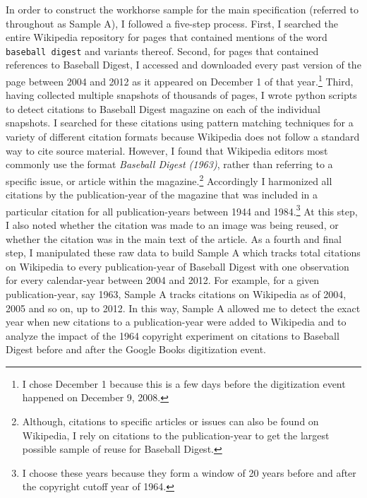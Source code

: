 \documentclass[11pt]{article}
\begin{document}
In order to construct the workhorse sample for the main specification (referred to throughout as Sample A), I followed a five-step process. First, I searched the entire Wikipedia repository for pages that contained mentions of the word \texttt{baseball digest} and variants thereof.  Second, for pages that contained references to Baseball Digest, I accessed and downloaded every past version of the page between 2004 and 2012 as it appeared on December 1 of that year.\footnote{I chose December 1 because this is a few days before the digitization event happened on December 9, 2008.} Third, having collected multiple snapshots of thousands of pages, I wrote python scripts to detect citations to Baseball Digest magazine on each of the individual snapshots. I searched for these citations using pattern matching techniques for a variety of different citation formats because Wikipedia does not follow a standard way to cite source material. However, I found that Wikipedia editors most commonly use the format \emph{Baseball Digest (1963)}, rather than referring to a specific issue, or article within the magazine.\footnote{Although, citations to specific articles or issues can also be found on Wikipedia, I rely on citations to the publication-year to get the largest possible sample of reuse for Baseball Digest.} Accordingly I harmonized all citations by the publication-year of the magazine that was included in a particular citation for all publication-years between 1944 and 1984.\footnote{I choose these years because they form a window of 20 years before and after the copyright cutoff year of 1964.} At this step, I also noted whether the citation was made to an image was being reused, or whether the citation was in the main text of the article. As a fourth and final step, I manipulated these raw data to build Sample A which tracks total citations on Wikipedia to every publication-year of Baseball Digest with one observation for every calendar-year between 2004 and 2012. For example, for a given publication-year, say 1963, Sample A tracks citations on Wikipedia as of 2004, 2005 and so on, up to 2012. In this way, Sample A allowed me to detect the exact year when new citations to a publication-year were added to Wikipedia and to analyze the impact of the 1964 copyright experiment on citations to Baseball Digest before and after the Google Books digitization event. 
\end{document}
